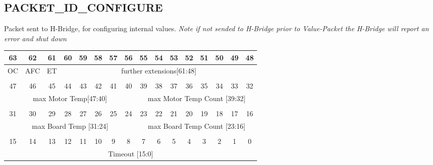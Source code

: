 \documentclass{article}
\begin{document}
\subsection{PACKET\_ID\_CONFIGURE}
Packet sent to H-Bridge, for configuring internal values.
{\em Note if not sended to H-Bridge prior to Value-Packet the H-Bridge
  will report an error and shut down}\\
\begin{tabular} { c c c c c c c c c c c c c c c c}
  63&62&61&60&59&58&57&56&55&54&53&52&51&50&49&48\\
  \hline
  \multicolumn{1}{|c|}{OC}& 
  \multicolumn{1}{|c|}{AFC}& 
  \multicolumn{1}{|c|}{ET}& 
  \multicolumn{13}{|c|}{further extensions[61:48]} \\
  \hline
  \multicolumn{16}{c}{} \\
  47&46&45&44&43&42&41&40&39&38&37&36&35&34&33&32\\
  \hline
  \multicolumn{8}{|c}{max Motor Temp[47:40]} &
  \multicolumn{8}{|c|}{max Motor Temp Count [39:32]}\\
  \hline
  \multicolumn{16}{c}{} \\
  31&30&29&28&27&26&25&24&23&22&21&20&19&18&17&16\\
  \hline
  \multicolumn{8}{|c|}{max Board Temp [31:24]} & 
  \multicolumn{8}{c|}{max Board Temp Count [23:16]} \\ 
  \hline
  \multicolumn{16}{c}{} \\
  15&14&13&12&11&10&9&8&7&6&5&4&3&2&1&0\\
  \hline
  \multicolumn{16}{|c|}{Timeout [15:0]} \\
  \hline
\end{tabular}
\end{document}
